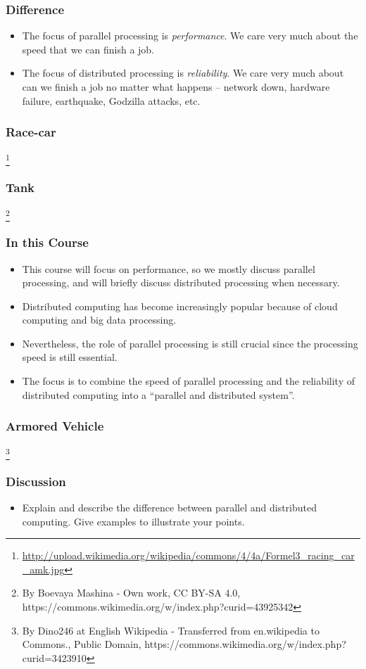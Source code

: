 \documentclass{beamer}
\begin{document}
\begin{CJK}{UTF8}{bsmi}
\begin{frame}
\frametitle{Difference}
\begin{itemize}
\item The focus of parallel processing is {\em performance}. 
We care very much about the speed that we can finish a job.
\item The focus of distributed processing is {\em reliability}. We care very much about can we finish a job no matter what happens -- network down, hardware failure, earthquake, Godzilla attacks, etc.
\end{itemize}
\end{frame}

\begin{frame}
\frametitle{Race-car}
\centerline{}
\footnote{\url{http://upload.wikimedia.org/wikipedia/commons/4/4a/Formel3_racing_car_amk.jpg}}
\end{frame}

\begin{frame}
\frametitle{Tank}
\centerline{}
\footnote{
By Boevaya Mashina - Own work, CC BY-SA 4.0, https://commons.wikimedia.org/w/index.php?curid=43925342
}
\end{frame}

\begin{frame}
\frametitle{In this Course}
\begin{itemize}
\item This course will focus on performance, so we mostly discuss
  parallel processing, and will briefly discuss distributed processing
  when necessary.
\item Distributed computing has become increasingly popular because of
  cloud computing and big data processing.
\item Nevertheless, the role of parallel processing is still crucial
  since the processing speed is still essential.
\item The focus is to combine the speed of parallel processing and the
  reliability of distributed computing into a ``parallel and
  distributed system''.
\end{itemize}
\end{frame}

\begin{frame}
\frametitle{Armored Vehicle}
\centerline{}
\footnote{By Dino246 at English Wikipedia - Transferred from en.wikipedia to Commons., Public Domain, https://commons.wikimedia.org/w/index.php?curid=3423910}
\end{frame}

\begin{frame}
\frametitle{Discussion} 
\begin{itemize}
\item Explain and describe the difference between parallel and
  distributed computing.  Give examples to illustrate your points.
\end{itemize}
\end{frame}


\end{CJK}
\end{document}
